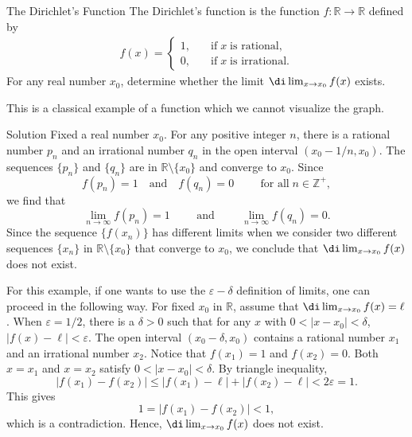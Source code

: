  \begin{example}[label=23020809]
 {The Dirichlet's Function} The Dirichlet's function is the function $f:\mathbb{R}\rightarrow\mathbb{R}$ defined by
 \begin{align*}
 f(x)=\begin{cases}1,\quad &\text{if}\; x\;\text{is rational},
 \\0,\quad &\text{if}\; x\;\text{is irrational}.\end{cases}
 \end{align*}
 For any  real number $x_0$, determine whether the limit $\di\lim_{x\rightarrow x_0}f(x)$ exists.
 \end{example}This is a classical example of a function which we cannot visualize the graph.
 \begin{solution}{Solution}
 Fixed a real number $x_0$. For any positive integer $n$, there is a rational number $p_n$ and an irrational number $q_n$ in the open interval $(x_0-1/n, x_0)$. The sequences $\{p_n\}$ and $\{q_n\}$ are in $\mathbb{R}\setminus\{x_0\}$ and converge to $x_0$. Since
 \[f(p_n)=1\quad\text{and}\quad f(q_n)=0\hspace{1cm}\text{for all}\;n\in\mathbb{Z}^+,\]
 we find that 
 \[\lim_{n\rightarrow\infty}f(p_n)=1\hspace{1cm}\text{and}\hspace{1cm}\lim_{n\rightarrow\infty}f(q_n)=0.\]
 Since the sequence $\{f(x_n)\}$ has different limits when we consider two different sequences $\{x_n\}$ in $\mathbb{R}\setminus\{x_0\}$ that converge to $x_0$, we conclude that   $\di\lim_{x\rightarrow x_0}f(x)$ does not exist. 
 \end{solution}
 For this example, if one wants to use the $\varepsilon-\delta$ definition of limits, one can proceed in the following way. For fixed $x_0$ in $\mathbb{R}$, assume that  $\di\lim_{x\rightarrow x_0}f(x)=\ell$. When $\varepsilon=1/2$, there is a $\delta>0$ such that for any $x$ with $0<|x-x_0|<\delta$, $|f(x)-\ell|<\varepsilon$. The open interval $(x_0-\delta, x_0)$ contains a rational number $x_1$  and an irrational number $x_2$. Notice that $f(x_1)=1$ and $f(x_2)=0$.  Both $x=x_1$ and $x=x_2$ satisfy $0<|x-x_0|<\delta$. By triangle inequality,
\[|f(x_1)-f(x_2)|\leq |f(x_1)-\ell|+|f(x_2)-\ell|<2\varepsilon=1.\]
This gives
\[1=|f(x_1)-f(x_2)|<1,\]which is a contradiction. Hence, $\di\lim_{x\rightarrow x_0}f(x)$ does not exist.
 
